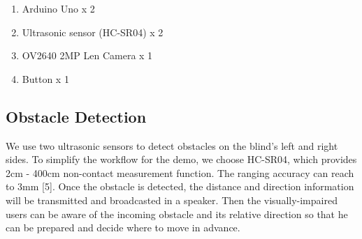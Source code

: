 \begin{enumerate}
  \item Arduino Uno x 2
  \item Ultrasonic sensor (HC-SR04) x 2
  \item OV2640 2MP Len Camera x 1
  \item Button x 1
\end{enumerate}

\subsection{Obstacle Detection}
We use two ultrasonic sensors to detect obstacles on the blind’s left and right sides. To simplify the workflow for the demo, we choose HC-SR04, which provides 2cm - 400cm non-contact measurement function. The ranging accuracy can reach to 3mm [5]. Once the obstacle is detected, the distance and direction information will be transmitted and broadcasted in a speaker. Then the visually-impaired users can be aware of the incoming obstacle and its relative direction so that he can be prepared and decide where to move in advance.

